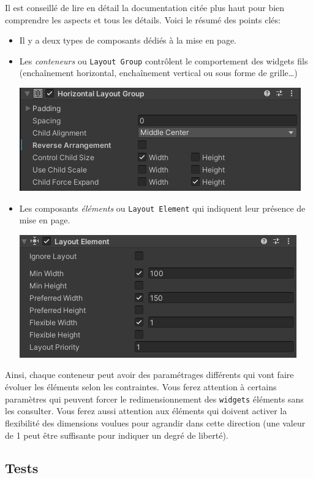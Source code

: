\documentclass[a4paper,10pt]{article}
\begin{document}
Il est conseillé de lire en détail la documentation citée plus haut pour bien comprendre les aspects et tous les détails. Voici le résumé des points clés:
\begin{itemize}
	\item Il y a deux types de composants dédiés à la mise en page.
	\item Les \textit{conteneurs} ou \texttt{Layout Group} contrôlent le comportement des widgets fils (enchaînement horizontal, enchaînement vertical ou sous forme de grille\ldots)
\begin{center}
	\includegraphics[width=0.6\linewidth]{rc/ui_layout_group_horiz}
\end{center}	
	\item Les composants \textit{éléments} ou \texttt{Layout Element} qui indiquent leur présence de mise en page.
\begin{center}
	\includegraphics[width=0.6\linewidth]{rc/ui_layout_element}
\end{center}
\end{itemize}

Ainsi, chaque conteneur peut avoir des paramétrages différents qui vont faire évoluer les éléments selon les contraintes. Vous ferez attention à certains paramètres qui peuvent forcer le redimensionnement des \texttt{widgets} éléments sans les consulter. Vous ferez aussi attention aux éléments qui doivent activer la flexibilité des dimensions voulues pour agrandir dans cette direction (une valeur de 1 peut être suffisante pour indiquer un degré de liberté).

\subsection*{Tests}
\end{document}
